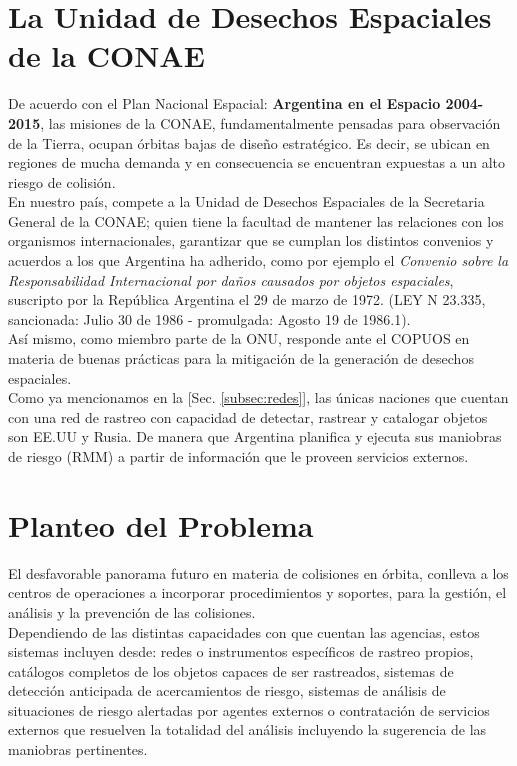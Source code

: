 \section{La Unidad de Desechos Espaciales de la CONAE}
De acuerdo con el Plan Nacional Espacial: {\bf{ Argentina en el Espacio 2004-2015}}, las misiones de la CONAE, fundamentalmente pensadas para observaci\'on de la Tierra, ocupan \'orbitas bajas de dise\~no estrat\'egico. Es decir, se ubican en regiones de mucha demanda y en consecuencia se encuentran expuestas a un alto riesgo de colisi\'on.\\
En nuestro pa\'is, compete a la Unidad de Desechos Espaciales de la Secretaria General de la CONAE; quien tiene la facultad de mantener las relaciones con los organismos internacionales, garantizar que se cumplan los distintos convenios y acuerdos a los que Argentina ha adherido, como por ejemplo el {\it{Convenio sobre la Responsabilidad Internacional por da\~nos causados por objetos espaciales}}, suscripto por la Rep\'ublica Argentina el 29 de marzo de 1972. (LEY N 23.335, sancionada: Julio 30 de 1986 - promulgada: Agosto 19 de 1986.1).\\
As\'i mismo, como miembro parte de la ONU, responde ante el COPUOS en materia de buenas pr\'acticas para la mitigaci\'on de la generaci\'on de desechos espaciales.\\

Como ya mencionamos en la [Sec. \ref{subsec:redes}], las \'unicas naciones que cuentan con una red de rastreo con capacidad de detectar, rastrear y catalogar objetos son EE.UU y Rusia. De manera que Argentina planifica y ejecuta sus maniobras de riesgo (RMM) a partir de informaci\'on que le proveen servicios externos.\\

\section{Planteo del Problema}

El desfavorable panorama futuro en materia de colisiones en \'orbita, conlleva a los centros de operaciones a incorporar procedimientos y soportes, para la gesti\'on, el an\'alisis y la prevenci\'on de las colisiones.\\
Dependiendo de las distintas capacidades con que cuentan las agencias, estos sistemas incluyen desde: redes o instrumentos espec\'ificos de rastreo propios, cat\'alogos completos de los objetos capaces de ser rastreados, sistemas de detecci\'on anticipada de acercamientos de riesgo, sistemas de an\'alisis de situaciones de riesgo alertadas por agentes externos o contrataci\'on de servicios externos que resuelven la totalidad del an\'alisis incluyendo la sugerencia de las maniobras pertinentes.\\

